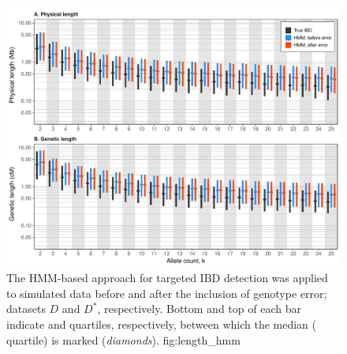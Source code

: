 

\begin{figure}[!htb]
\includegraphics[width=\textwidth]{./img/ch4/length_hmm}
{The HMM-based approach for targeted IBD detection was applied to simulated data before and after the inclusion of genotype error; \ie datasets $D$ and $D^\ast$, respectively.
Bottom and top of each bar indicate  and  quartiles, respectively, between which the median ( quartile) is marked (\emph{diamonds}).}
{fig:length_hmm}
\end{figure}
